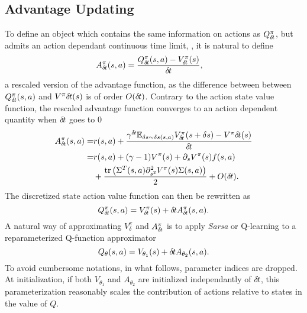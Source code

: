 \subsection{Advantage Updating}
\label{subsec:reparam}
To define an object which contains the same information on actions as
$Q^\pi_{\delta\hspace{-.1em}t}$, but admits an action dependant continuous time limit, , it is
natural to define
\begin{align}
	A^\pi_{\delta\hspace{-.1em}t}(s, a) &= \frac{Q^\pi_{\delta\hspace{-.1em}t}(s,a) - V^\pi_{\delta\hspace{-.1em}t}(s)}{{\delta\hspace{-.1em}t}},
    \label{eq:adv}
\end{align}
a rescaled version of the advantage function, as the difference between between
$Q^\pi_{\delta\hspace{-.1em}t}(s, a)$ and $V^\pi{\delta\hspace{-.1em}t}(s)$ is of order $O({\delta\hspace{-.1em}t})$.
Contrary to the action state value function, the rescaled advantage function converges
to an action dependent quantity when ${\delta\hspace{-.1em}t}$ goes to $0$
\begin{align}
	A^\pi_{\delta\hspace{-.1em}t}(s, a)=&{r}(s, a)+\frac{\gamma^{{\delta\hspace{-.1em}t}}\mathbb{E}_{\delta s \sim \delta s(s, a)}V^\pi_{\delta\hspace{-.1em}t}(s + \delta s)-V^\pi{\delta\hspace{-.1em}t}(s)}{{\delta\hspace{-.1em}t}}\nonumber\\
	=&{r}(s, a)+(\gamma - 1) V^\pi(s)+\partial_s V^\pi(s)f(s, a)\nonumber\\
         &+\frac{\text{tr}\left(\Sigma^T(s, a)\partial^2_{s^2}V^\pi(s) \Sigma(s,a)\right)}{2} + O({\delta\hspace{-.1em}t})\nonumber.
\end{align}
The discretized state action value function can then be rewritten as
\begin{equation}
	Q^\pi_{\delta\hspace{-.1em}t}(s, a) = V^\pi_{\delta\hspace{-.1em}t}(s) + {\delta\hspace{-.1em}t} A^\pi_{\delta\hspace{-.1em}t}(s, a).
	\label{eq:reparam_q_pi}
\end{equation}
A natural way of approximating $V^\pi_\delta$ and $A^\pi_{\delta\hspace{-.1em}t}$ is to apply
\emph{Sarsa} or Q-learning to a reparameterized Q-function approximator
\begin{equation}
	Q_\theta(s, a) = V_{\theta_1}(s) + {\delta\hspace{-.1em}t} A_{\theta_2}(s, a).
\end{equation}
To avoid cumbersome notations, in what follows, parameter indices are dropped.
At initialization, if both $V_{\theta_1}$ and $A_{\theta_2}$ are initialized
independantly of ${\delta\hspace{-.1em}t}$, this parameterization reasonably scales the
contribution of actions relative to states in the value of $Q$.  

